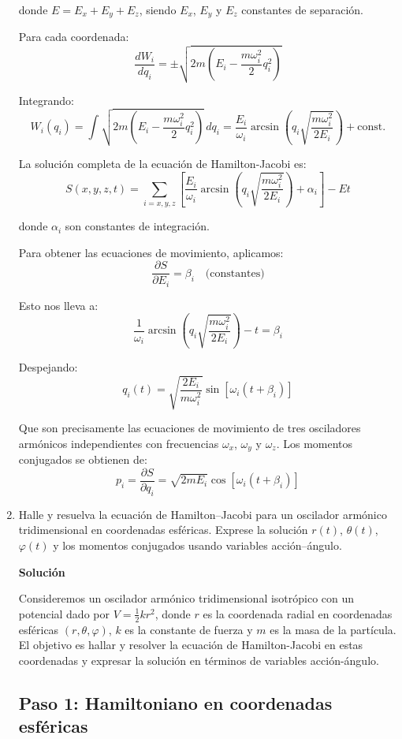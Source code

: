 \documentclass[12pt]{article}
\begin{document}
\begin{enumerate}
  donde $E = E_x + E_y + E_z$, siendo $E_x$, $E_y$ y $E_z$ constantes de separación.

  Para cada coordenada:
  \[
  \frac{dW_i}{dq_i} = \pm\sqrt{2m\left(E_i - \frac{m\omega_i^2}{2}q_i^2\right)}
  \]

  Integrando:
  \[
  W_i(q_i) = \int\sqrt{2m\left(E_i - \frac{m\omega_i^2}{2}q_i^2\right)}\,dq_i = \frac{E_i}{\omega_i}\arcsin\left(q_i\sqrt{\frac{m\omega_i^2}{2E_i}}\right) + \text{const.}
  \]

  La solución completa de la ecuación de Hamilton-Jacobi es:
  \[
  S(x,y,z,t) = \sum_{i=x,y,z}\left[\frac{E_i}{\omega_i}\arcsin\left(q_i\sqrt{\frac{m\omega_i^2}{2E_i}}\right) + \alpha_i\right] - Et
  \]

  donde $\alpha_i$ son constantes de integración.

  Para obtener las ecuaciones de movimiento, aplicamos:
  \[
  \frac{\partial S}{\partial E_i} = \beta_i \quad \text{(constantes)}
  \]

  Esto nos lleva a:
  \[
  \frac{1}{\omega_i}\arcsin\left(q_i\sqrt{\frac{m\omega_i^2}{2E_i}}\right) - t = \beta_i
  \]

  Despejando:
  \[
  q_i(t) = \sqrt{\frac{2E_i}{m\omega_i^2}}\sin[\omega_i(t + \beta_i)]
  \]

  Que son precisamente las ecuaciones de movimiento de tres osciladores armónicos independientes con frecuencias $\omega_x$, $\omega_y$ y $\omega_z$. Los momentos conjugados se obtienen de:
  \[
  p_i = \frac{\partial S}{\partial q_i} = \sqrt{2mE_i}\cos[\omega_i(t + \beta_i)]
  \]

  \item Halle y resuelva la ecuación de Hamilton–Jacobi para un oscilador armónico tridimensional en coordenadas esféricas. Exprese la solución \(r(t)\), \(\theta(t)\), \(\varphi(t)\) y los momentos conjugados usando variables acción–ángulo.
  
  \textbf{Solución}

  Consideremos un oscilador armónico tridimensional isotrópico con un potencial dado por \( V = \frac{1}{2} k r^2 \), donde \( r \) es la coordenada radial en coordenadas esféricas \( (r, \theta, \varphi) \), \( k \) es la constante de fuerza y \( m \) es la masa de la partícula. El objetivo es hallar y resolver la ecuación de Hamilton-Jacobi en estas coordenadas y expresar la solución en términos de variables acción-ángulo.

  \subsection*{Paso 1: Hamiltoniano en coordenadas esféricas}


\end{enumerate}
\end{document}
